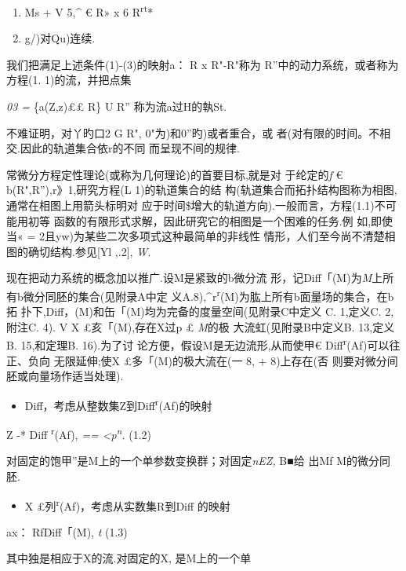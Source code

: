 \documentclass{article}
\begin{document}
\begin{enumerate}
\def\labelenumi{(\arabic{enumi})}
\setcounter{enumi}{1}
\item
  Ms + V 5,\^{} € R» x 6 R\textsuperscript{rt}*
\item
  g/)对Qu)连续.
\end{enumerate}

我们把满足上述条件(1)-(3)的映射a： R x R"-R"称为
R''中的动力系统，或者称为方程(1. 1)的流，并把点集

\emph{03 =} \{a(Z,z)\textbar{}££ R\} U R'' 称为流a过H的執St.

不难证明，对丫旳口2 G R", 0"为)和0''旳)或者重合，或
者(对有限的时间。不相交.因此的轨道集合依r的不同 而呈现不间的规律.

常微分方程定性理论(或称为几何理论)的首要目标,就是对 于纶定的\emph{f} €
b(R",R''),r》1,研究方程(L 1)的轨道集合的结
构(轨道集合而拓扑结构图称为相图,通常在相图上用箭头标明对
应于时间\$增大的轨道方向).一般而言，方程(1.1)不可能用初等
函数的有限形式求解，因此研究它的相图是一个困难的任务.例 如,即使当« =
2且yw)为某些二次多项式这种最简单的非线性
情形，人们至今尚不清楚相图的确切结构.参见{[}Yl ,.2{]}, \emph{W.}

现在把动力系统的概念加以推广.设M是紧致的b微分流
形，记Diff「(M)为\emph{M}上所有b微分同胚的集合(见附录A中定
义A.8),\^{}r\textsuperscript{r}(M)为肱上所有b面量场的集合，在b拓
扑下,Diff，(M)和缶「(M)均为完备的度量空间(见附录C中定义 C. 1,定义C.
2,附注C. 4). V X £亥「(M),存在X过p £ \emph{M}的极 大流虹(见附录B中定义B.
13,定义B. 15,和定理B. 16).为了讨 论方便，假设M是无边流形,从而使甲€
Diff\textsuperscript{r}(Af)可以往正、负向 无限延伸;使X
£多「(M)的极大流在(一 8, + 8)上存在(否
则要对微分间胚或向量场作适当处理).

\begin{itemize}
\item
  Diff，考虑从整数集Z到Diff\textsuperscript{r}(Af)的映射
\end{itemize}

Z -* Diff \textsuperscript{r}(Af), \emph{==
\textless{}p\textsuperscript{n}.} (1.2)

对固定的饱甲''是M上的一个单参数变换群；对固定\emph{nEZ,} B■给 出Mf
M的微分同胚.

\begin{itemize}
\item
  X £列\textsuperscript{r}(Af)，考虑从实数集R到Diff 的映射
\end{itemize}

ax： RfDiff「(M), \emph{t} (1.3)

其中独是相应于X的流.对固定的X, 是M上的一个单
\end{document}
